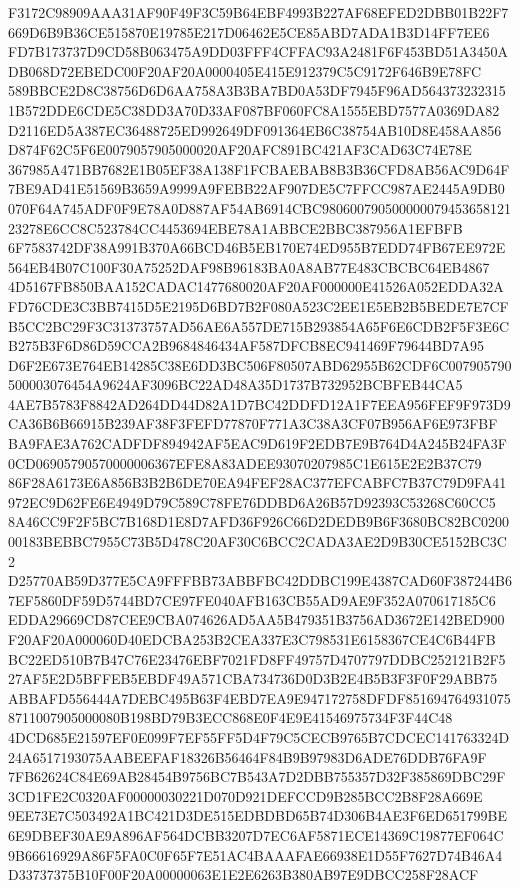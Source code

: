 \documentclass[UTF8,fontset=fandol,zihao=-4,a4paper]{ctexart}
\begin{document}
{{F3172C98909AAA31AF90F49F3C59B64EBF4993B227AF68EFED2DBB01B22F7669D6B9B36CE515870E19785E217D06462E5CE85ABD7ADA1B3D14FF7EE6
FD7B173737D9CD58B063475A9DD03FFF4CFFAC93A2481F6F453BD51A3450ADB068D72EBEDC00F20AF20A0000405E415E912379C5C9172F646B9E78FC
589BBCE2D8C38756D6D6AA758A3B3BA7BD0A53DF7945F96AD5643732323151B572DDE6CDE5C38DD3A70D33AF087BF060FC8A1555EBD7577A0369DA82
D2116ED5A387EC36488725ED992649DF091364EB6C38754AB10D8E458AA856D874F62C5F6E0079057905000020AF20AFC891BC421AF3CAD63C74E78E
367985A471BB7682E1B05EF38A138F1FCBAEBAB8B3B36CFD8AB56AC9D64F7BE9AD41E51569B3659A9999A9FEBB22AF907DE5C7FFCC987AE2445A9DB0
070F64A745ADF0F9E78A0D887AF54AB6914CBC98060079050000007945365812123278E6CC8C523784CC4453694EBE78A1ABBCE2BBC387956A1EFBFB
6F7583742DF38A991B370A66BCD46B5EB170E74ED955B7EDD74FB67EE972E564EB4B07C100F30A75252DAF98B96183BA0A8AB77E483CBCBC64EB4867
4D5167FB850BAA152CADAC1477680020AF20AF000000E41526A052EDDA32AFD76CDE3C3BB7415D5E2195D6BD7B2F080A523C2EE1E5EB2B5BEDE7E7CF
B5CC2BC29F3C31373757AD56AE6A557DE715B293854A65F6E6CDB2F5F3E6CB275B3F6D86D59CCA2B9684846434AF587DFCB8EC941469F79644BD7A95
D6F2E673E764EB14285C38E6DD3BC506F80507ABD62955B62CDF6C007905790500003076454A9624AF3096BC22AD48A35D1737B732952BCBFEB44CA5
4AE7B5783F8842AD264DD44D82A1D7BC42DDFD12A1F7EEA956FEF9F973D9CA36B6B66915B239AF38F3FEFD77870F771A3C38A3CF07B956AF6E973FBF
BA9FAE3A762CADFDF894942AF5EAC9D619F2EDB7E9B764D4A245B24FA3F0CD06905790570000006367EFE8A83ADEE93070207985C1E615E2E2B37C79
86F28A6173E6A856B3B2B6DE70EA94FEF28AC377EFCABFC7B37C79D9FA41972EC9D62FE6E4949D79C589C78FE76DDBD6A26B57D92393C53268C60CC5
8A46CC9F2F5BC7B168D1E8D7AFD36F926C66D2DEDB9B6F3680BC82BC020000183BEBBC7955C73B5D478C20AF30C6BCC2CADA3AE2D9B30CE5152BC3C2
D25770AB59D377E5CA9FFFBB73ABBFBC42DDBC199E4387CAD60F387244B67EF5860DF59D5744BD7CE97FE040AFB163CB55AD9AE9F352A070617185C6
EDDA29669CD87CEE9CBA074626AD5AA5B479351B3756AD3672E142BED900F20AF20A000060D40EDCBA253B2CEA337E3C798531E6158367CE4C6B44FB
BC22ED510B7B47C76E23476EBF7021FD8FF49757D4707797DDBC252121B2F527AF5E2D5BFFEB5EBDF49A571CBA734736D0D3B2E4B5B3F3F0F29ABB75
ABBAFD556444A7DEBC495B63F4EBD7EA9E947172758DFDF8516947649310758711007905000080B198BD79B3ECC868E0F4E9E41546975734F3F44C48
4DCD685E21597EF0E099F7EF55FF5D4F79C5CECB9765B7CDCEC141763324D24A6517193075AABEEFAF18326B56464F84B9B97983D6ADE76DDB76FA9F
7FB62624C84E69AB28454B9756BC7B543A7D2DBB755357D32F385869DBC29F3CD1FE2C0320AF00000030221D070D921DEFCCD9B285BCC2B8F28A669E
9EE73E7C503492A1BC421D3DE515EDBDBD65B74D306B4AE3F6ED651799BE6E9DBEF30AE9A896AF564DCBB3207D7EC6AF5871ECE14369C19877EF064C
9B66616929A86F5FA0C0F65F7E51AC4BAAAFAE66938E1D55F7627D74B46A4D33737375B10F00F20A00000063E1E2E6263B380AB97E9DBCC258F28ACF
}}
\end{document}
